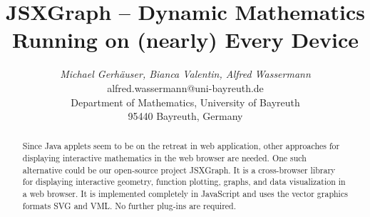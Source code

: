 \documentclass[12pt,a4paper]{article}%
\begin{document}
%
%
\title{JSXGraph -- Dynamic Mathematics Running on (nearly) Every Device}%
%
%
\author{\begin{tabular}{c}
\textit{Michael Gerh\"auser, Bianca Valentin, Alfred Wassermann} \\
alfred.wassermann@uni-bayreuth.de\\
Department of Mathematics, 
University of Bayreuth\\
95440 Bayreuth, 
Germany\end{tabular}
}%
%
\date{}                                                   %
\maketitle                                                %
%
%
\begin{abstract}
%
Since Java applets seem to be on the retreat in web application, other 
approaches for displaying interactive mathematics in the web browser are needed. 
One such alternative could be our open-source project JSXGraph. It is a 
cross-browser library for displaying interactive geometry, function plotting, 
graphs, and data visualization in a web browser. It is implemented completely 
in JavaScript and uses the vector graphics formats SVG and VML. No further 
plug-ins are required.
%
\end{abstract}%
%
\thispagestyle{fancy}                                     %
%
%
\end{document}
